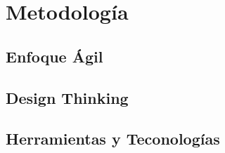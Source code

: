 \chapter{Metodología}

\section{Enfoque Ágil}

\section{Design Thinking}

\section{Herramientas y Teconologías}
